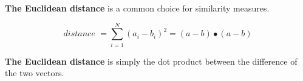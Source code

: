 \documentclass{article}
\begin{document}
\begin{landscape}

\centerline{\textbf{The Euclidean distance} is a common choice for similarity measures.}
$$ \textit{distance } = \sum_{i=1}^{N} (a_i - b_i)^2 = (a - b) \bullet (a - b)$$
\centerline{\textbf{The Euclidean distance} is simply the dot product between the difference of the two vectors.}

\end{landscape}
\end{document}
